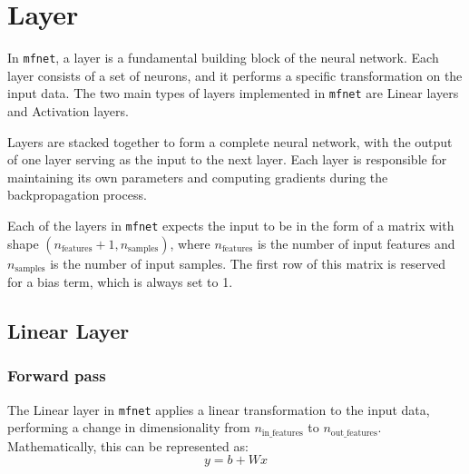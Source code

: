 \section{Layer}

In \texttt{mfnet}, a layer is a fundamental building block of the neural network. Each layer consists of a set of neurons, and it performs a specific transformation on the input data. The two main types of layers implemented in \texttt{mfnet} are Linear layers and Activation layers.


Layers are stacked together to form a complete neural network, with the output of one layer serving as the input to the next layer.  Each layer is responsible for maintaining its own parameters and computing gradients during the backpropagation process.

Each of the layers in \texttt{mfnet} expects the input to be in the form of a matrix with shape $(n_{\text{features}} + 1, n_{\text{samples}})$, where $n_{\text{features}}$ is the number of input features and $n_{\text{samples}}$ is the number of input samples. The first row of this matrix is reserved for a bias term, which is always set to 1.

\subsection{Linear Layer}
\subsubsection{Forward pass}
The Linear layer in \texttt{mfnet} applies a linear transformation to the input data, performing a change in dimensionality from $n_{\text{in\_features}}$ to $n_{\text{out\_features}}$. Mathematically, this can be represented as:
\begin{equation}
    y = b + Wx
\end{equation}


